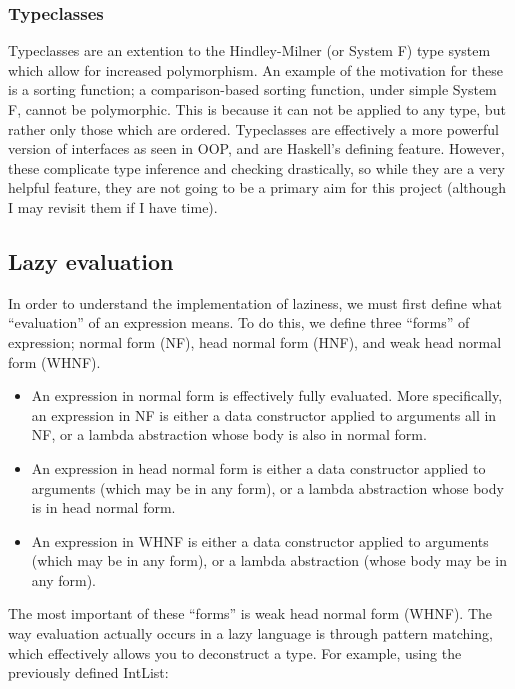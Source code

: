 \documentclass[9pt]{extarticle}
\begin{document}
\subsubsection{Typeclasses}

Typeclasses are an extention to the Hindley-Milner (or System F) type system
which allow for increased polymorphism. An example of the motivation for these
is a sorting function; a comparison-based sorting function, under simple System
F, cannot be polymorphic. This is because it can not be applied to any type, but
rather only those which are ordered. Typeclasses are effectively a more powerful
version of interfaces as seen in OOP, and are Haskell's defining feature.
However, these complicate type inference and checking drastically, so while they
are a very helpful feature, they are not going to be a primary aim for this
project (although I may revisit them if I have time).

\subsection{Lazy evaluation}

In order to understand the implementation of laziness, we must first define what
``evaluation'' of an expression means. To do this, we define three ``forms'' of
expression; normal form (NF), head normal form (HNF), and weak head normal form
(WHNF). 

\begin{itemize}

  \item An expression in normal form is effectively fully evaluated. More
  specifically, an expression in NF is either a data constructor applied to
  arguments all in NF, or a lambda abstraction whose body is also in normal
  form. 

  \item An expression in head normal form is either a data constructor applied to
  arguments (which may be in any form), or a lambda abstraction whose body is
  in head normal form. 

  \item An expression in WHNF is either a data constructor applied to arguments
  (which may be in any form), or a lambda abstraction (whose body may be in
  any form). 

\end{itemize}

The most important of these ``forms'' is weak head normal form (WHNF). The way
evaluation actually occurs in a lazy language is through pattern matching, which
effectively allows you to deconstruct a type. For example, using the previously
defined IntList: 
\end{document}
